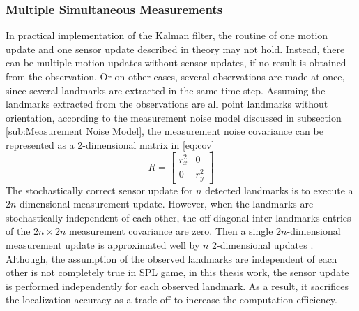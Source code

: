 \subsubsection{Multiple Simultaneous Measurements}
In practical implementation of the Kalman filter, the routine of one motion update and one sensor update described in theory may not hold. Instead, there can be multiple motion updates without sensor updates, if no result is obtained from the observation. Or on other cases, several observations are made at once, since several landmarks are extracted in the same time step. Assuming the landmarks extracted from the observations are all point landmarks without orientation, according to the measurement noise model discussed in subsection \ref{sub:Measurement Noise Model}, the measurement noise covariance can be represented as a 2-dimensional matrix in \autoref{eq:cov}
\begin{equation}
  \label{eq:cov}
  R = 
  \begin{bmatrix}
    r_x^2 & 0 \\ 
    0 & r_y^2
  \end{bmatrix}
\end{equation}
The stochastically correct sensor update for $n$ detected landmarks is to execute a $2n$-dimensional measurement update. However, when the landmarks are stochastically independent of each other, the off-diagonal inter-landmarks entries of the $2n \times 2n$ measurement covariance are zero. Then a single $2n$-dimensional measurement update is approximated well by $n$ $2$-dimensional updates \cite{Tasse2013}. Although, the assumption of the observed landmarks are independent of each other is not completely true in \gls{SPL} game, in this thesis work, the sensor update is performed independently for each observed landmark. As a result, it sacrifices the localization accuracy as a trade-off to increase the computation efficiency.


